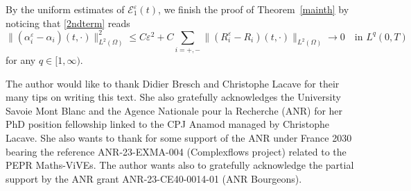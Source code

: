 \documentclass[11pt, twoside, a4paper]{article}
\theoremstyle{plain}
\theoremstyle{remark}
\numberwithin{equation}{section}
\def\EE{{\mathcal E}}
\renewcommand{\leq}{\leqslant}\renewcommand{\le}{\leqslant}
\newcommand{\eps}{\varepsilon}
\begin{document}
By the uniform estimates of $\EE_1^\eps(t)$, we finish the proof of Theorem~\ref{mainth} by noticing that \eqref{2ndterm} reads
\[
\| (\alpha_i^\eps - \alpha_i)(t,\cdot)\|_{L^2(\Omega)}^2 \leq C\eps^2 + C \sum_{i=+,-}\| (R_i^\eps - R_i)(t,\cdot)\|_{L^2(\Omega)}\to 0 \quad \text{in }L^q(0,T)
\]
for any $q\in [1,\infty)$.



\bigskip

 The author would like to thank Didier Bresch and Christophe Lacave for their many tips on writing this text. 
She also gratefully acknowledges the University Savoie Mont Blanc and the Agence Nationale pour la Recherche (ANR) for her PhD position fellowship linked to the CPJ Anamod managed by Christophe Lacave. She also wants to thank for some support of the ANR under France 2030 bearing the reference ANR-23-EXMA-004 (Complexflows project) related to the PEPR Maths-ViVEs. The author wants also to gratefully acknowledge the partial support by the ANR grant ANR-23-CE40-0014-01 (ANR Bourgeons).
\end{document}
